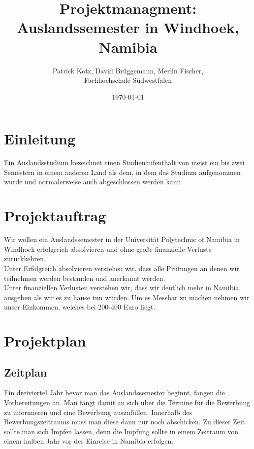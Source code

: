 \documentclass[11pt]{article}
\begin{document}
\begin{titlepage}
  \title{Projektmanagment: \\Auslandssemester in Windhoek, Namibia}
  \author{Patrick Kotz, David Brüggemann, Merlin Fischer,\\ Fachhochschule Südwestfalen}
  \date{\today}
\end{titlepage}

\fancyfoot[C]{\thepage}

\maketitle

\newpage
\tableofcontents
\newpage

\section{Einleitung}
Ein Auslandsstudium bezeichnet einen Studienaufenthalt von meist ein bis zwei Semestern in einem anderen Land als dem, in dem das Studium aufgenommen wurde und normalerweise auch abgeschlossen werden kann.

\section{Projektauftrag}
Wir wollen ein Auslandssemester in der Universität Polytechnic of Namibia in Windhoek erfolgreich absolvieren und ohne große finanzielle Verluste zurückkehren.\\

Unter Erfolgreich absolvieren verstehen wir, dass alle Prüfungen an denen wir teilnehmen werden bestanden und anerkannt werden.\\

Unter finanziellen Verlusten verstehen wir, dass wir deutlich mehr in Namibia ausgeben als wir es zu hause tun würden. Um es Messbar zu machen nehmen wir unser Einkommen, welches bei 200-400 Euro liegt.

\newpage

\section{Projektplan}

\subsection{Zeitplan}
Ein dreiviertel Jahr bevor man das Auslandssemester beginnt, fangen die Vorbereitungen an. Man fängt damit an sich über die Termine für die Bewerbung zu informieren und eine Bewerbung auszufüllen. Innerhalb des Bewerbungszeitraums muss man diese dann nur noch abschicken. Zu dieser Zeit sollte man sich Impfen lassen, denn die Impfung sollte in einem Zeitraum von einem halben Jahr vor der Einreise in Namibia erfolgen. 
\end{document}
